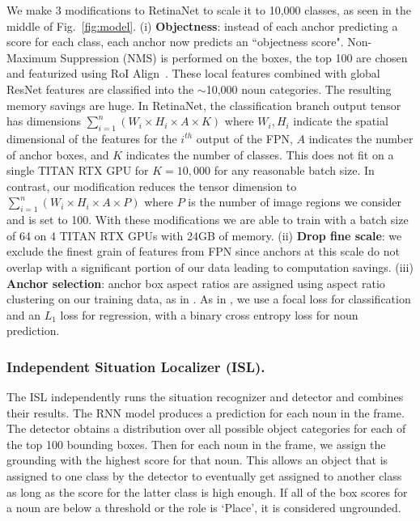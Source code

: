 \documentclass[runningheads]{llncs}
\begin{document}
We make 3 modifications to RetinaNet to scale it to 10,000 classes, as seen in the middle of Fig.~\ref{fig:model}. (i) \textbf{Objectness}: instead of each anchor predicting a score for each class, each anchor now predicts an ``objectness score". Non-Maximum Suppression (NMS) is performed on the boxes, the top 100 are chosen and featurized using RoI Align~\cite{fasterrcnn}. These local features combined with global ResNet features are classified into the $\sim$10,000 noun categories. The resulting memory savings are huge. In RetinaNet, the classification branch output tensor has dimensions $\sum_{i=1}^n(W_i \times H_i \times A \times K)$ where $W_i,H_i$ indicate the spatial dimensional of the features for the $i^{th}$ output of the FPN, $A$ indicates the number of anchor boxes, and $K$ indicates the number of classes. This does not fit on a single TITAN RTX GPU for $K = 10,000$ for any reasonable batch size. In contrast, our modification reduces the tensor dimension to $\sum_{i=1}^n(W_i \times H_i \times A \times P)$ where $P$ is the number of image regions we consider and is set to 100. With these modifications we are able to train with a batch size of 64 on 4 TITAN RTX GPUs with 24GB of memory. (ii) \textbf{Drop fine scale}: we exclude the finest grain of features from FPN since anchors at this scale do not overlap with a significant portion of our data leading to computation savings. (iii) \textbf{Anchor selection}: anchor box aspect ratios are assigned using aspect ratio clustering on our training data, as in \cite{yolo}. As in \cite{retinanet}, we use a focal loss for classification and an $L_1$ loss for regression, with a binary cross entropy loss for noun prediction.


\vspace{-5mm}
\subsubsection{Independent Situation Localizer (ISL). } 
The ISL independently runs the situation recognizer and detector and combines their results. The RNN model produces a prediction for each noun in the frame. The detector obtains a distribution over all possible object categories for each of the top 100 bounding boxes. Then for each noun in the frame, we assign the grounding with the highest score for that noun. This allows an object that is assigned to one class by the detector to eventually get assigned to another class as long as the score for the latter class is high enough. If all of the box scores for a noun are below a threshold or the role is `Place', it is considered ungrounded. 
\end{document}
